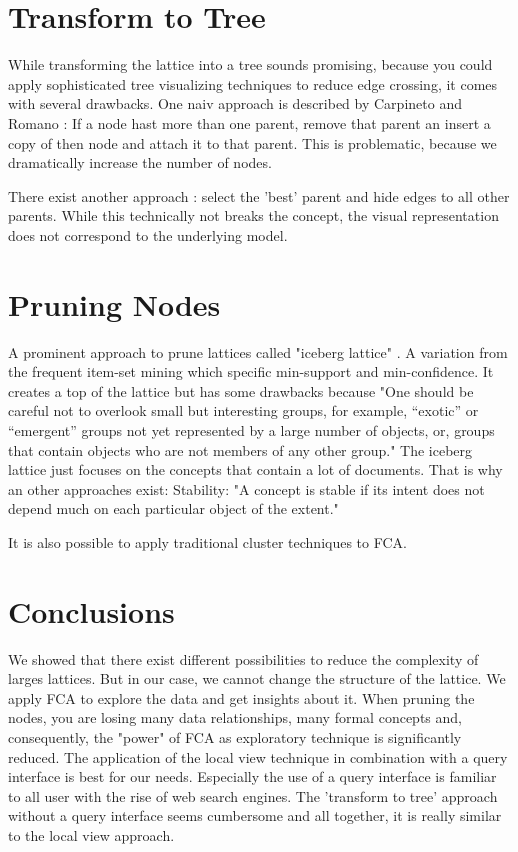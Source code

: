 \documentclass[11pt]{report}
\begin{document}
\section{Transform to Tree}

While transforming the lattice into a tree sounds promising, because you could apply sophisticated tree visualizing techniques to reduce edge crossing, it comes with several drawbacks. One naiv approach is described by Carpineto and Romano \cite{carpineto2004concept}: If a node hast more than one parent, remove that parent an insert a copy of then node and attach it to that parent. This is problematic, because we dramatically increase the number of nodes. 

There exist another approach \cite{Melo2011}: select the 'best' parent and hide edges to all other parents. While this technically not breaks the concept, the visual representation does not correspond to the underlying model.

\section{Pruning Nodes}

A prominent approach to prune lattices called "iceberg lattice" \cite{Stumme2002}. A variation from the frequent item-set mining which specific min-support and min-confidence\cite{Agrawal1993}. It creates a top of the lattice but has some drawbacks because "One should be careful not to overlook small but interesting groups, for example, “exotic” or “emergent” groups not yet represented by a large number of objects, or, groups that contain objects who are not members of any other group."\cite{Kuznetsov20072} The iceberg lattice just focuses on the concepts that contain a lot of documents. That is why an other approaches exist: Stability\cite{Kuznetsov2007}: "A concept is stable if its intent does not depend much on each particular object of the extent." \cite{Kuznetsov20072}

	It is also possible to apply traditional cluster techniques to FCA.\cite{AswaniKumar2010}


\section{Conclusions}

We showed that there exist different possibilities to reduce the complexity of larges lattices. But in our case, we cannot change the structure of the lattice. We apply FCA to explore the data and get insights about it. When pruning the nodes, you are losing many data relationships, many formal concepts and, consequently, the "power" of FCA as exploratory technique is significantly reduced.
The application of the local view technique in combination with a query interface is best for our needs. Especially the use of a query interface is familiar to all user with the rise of web search engines. The 'transform to tree' approach without a query interface seems cumbersome and all together, it is really similar to the local view approach.
\end{document}

